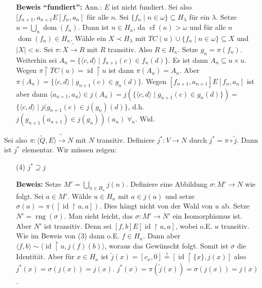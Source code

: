 \documentclass[a4paper,fontsize=11pt]{scrartcl}
\newcommand{\rng}{\operatorname{rng}}
\newcommand{\cf}{\operatorname{cf}}
\newcommand{\dom}{\operatorname{dom}}
\newcommand{\id}{\operatorname{id}}
\begin{document}
\begin{itemize}
	\item[] {\bf Beweis ``fundiert'':} Ann.: $E$ ist nicht fundiert.
		Sei also $[f_{n+1},a_{n+1}E[f_n,a_n]$ für alle $n$.
		Sei $\{f_n\mid n\in \omega\}\subseteq H_{\lambda}$ für ein $\lambda$.
		Setze $u=\bigcup_n\dom(f_n)$.
		Dann ist $n\in H_{\kappa}$, da $\cf(\kappa)>\omega$ und für alle $n$ $\dom(f_n)\in H_{\kappa}$.
		Wähle ein $X\prec H_\lambda$ mit $TC(u)\cup\{f_n\mid n\in\omega\}\subseteq X$ und $|X|<\kappa$.
		Sei $\pi\colon X\tilde\to R$ mit $R$ transitiv.
		Also $R\in H_{\kappa}$.
		Setze $g_n=\pi(f_n)$.
		Weiterhin sei $A_n=\{\langle c,d\rangle\mid f_{n+1}(c)\in f_n(d)\}$.
		Es ist dann $A_n\subseteq u\times u$.
		Wegen $\pi\upharpoonright TC(u)=\id\upharpoonright u$ ist dann $\pi(A_n)=A_n$.
		Aber $\pi(A_n)=\{\langle c,d\rangle\mid g_{n+1}(c)\in g_n(d)\}$.
		Wegen $[f_{n+1},a_{n+1}]E[f_n,a_n]$ ist aber dann $\langle a_{n+1},a_n\rangle\in j(A_n)=j(\{\langle c,d\rangle\mid g_{n+1}(c)\in g_n(d)\})=$
		$\{\langle c,d\rangle\mid j(g_{n+1}(c)\in j(g_n)(d)\}$, d.h. $j(g_{n+1}(a_{n+1})\in j(g_n))(a_n)\;\forall_n$. Wid.
\end{itemize}
Sei also $\pi\colon\langle \tilde Q,E\rangle\tilde\to N$ mit $N$ transitiv.
Definiere $j^*\colon V\to N$ durch $j^*=\pi\circ\tilde j$.
Dann ist $j^*$ elementar.
Wir müssen zeigen:
\begin{itemize}\item[(4)] $j^*\supseteq j$

		{\bf Beweis:} Setze $M'=\bigcup_{n\in H_\kappa}j(n)$.
		Definiere eine Abbildung $\sigma\colon M'\to N$ wie folgt.
		Sei $a\in M'$.
		Wähle $u\in H_{\kappa}$ mit $a\in j(u)$
		und setze $\sigma(a)=\pi([\id\upharpoonright u, a])$.
		Dies hängt nicht von der Wahl von $u$ ab.
		Setze $N'=\rng(\sigma)$.
		Man sieht leicht, das $\sigma\colon M'\to N'$ ein Isomorphismus ist.
		Aber $N'$ ist transitiv.
		Denn sei $[f,b]E[\id\upharpoonright u,a]$, wobei o.E. $u$ transitiv.
		Wie im Beweis von (3) dann o.E. $f\in H_\kappa$.
		Dann aber $\langle f,b\rangle\sim\langle \id\upharpoonright u, j(f)(b)\rangle$, woraus das Gewünscht folgt.
		Somit ist $\sigma$ die Identität.
		Aber für $x\in H_\kappa$ ist $\tilde j(x)=[c_x,0] \stackrel{!}{=}[\id\upharpoonright\{x\}, j(x)]$
		also $j^*(x)=\sigma(j(x))=j(x)$.
		$j^*(x)=\pi(\tilde j(x))=\sigma(j(x))=j(x)$.
\end{itemize}
\end{document}
